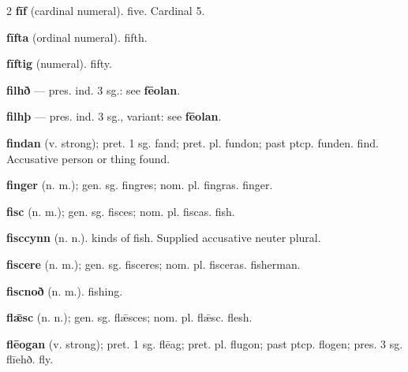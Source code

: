 \begin{multicols*}{2}
\textbf{fīf} (cardinal numeral). five. Cardinal 5.\par
\textbf{fīfta} (ordinal numeral). fifth.\par
\textbf{fīftig} (numeral). fifty.\par
\textbf{filhð} — pres. ind. 3 sg.: see \textbf{fēolan}.\par
\textbf{filhþ} — pres. ind. 3 sg., variant: see \textbf{fēolan}.\par
\textbf{findan} (v. strong); pret. 1 sg. fand; pret. pl. fundon; past ptcp. funden. find. Accusative person or thing found.\par
\textbf{finger} (n. m.); gen. sg. fingres; nom. pl. fingras. finger.\par
\textbf{fisc} (n. m.); gen. sg. fisces; nom. pl. fiscas. fish.\par
\textbf{fisccynn} (n. n.). kinds of fish. Supplied accusative neuter plural.\par
\textbf{fiscere} (n. m.); gen. sg. fisceres; nom. pl. fisceras. fisherman.\par
\textbf{fiscnoð} (n. m.). fishing.\par
\textbf{flǣsc} (n. n.); gen. sg. flǣsces; nom. pl. flǣsc. flesh.\par
\textbf{flēogan} (v. strong); pret. 1 sg. flēag; pret. pl. flugon; past ptcp. flogen; pres. 3 sg. flīehð. fly.\par

\end{multicols*}
